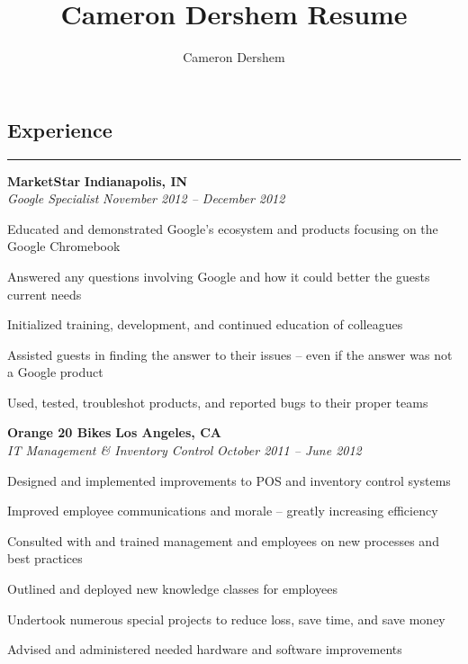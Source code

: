 \documentclass[10pt,letterpaper]{article}			%
\author{Cameron Dershem}							%
\title{Cameron Dershem Resume}						%
\newcommand{\JobHeader}[4]{							%
			\vspace{-.4em}
			\textbf{#1}
			\hfill
			\textbf{#2}
			\\
			\emph{#3}
			\hfill
			\emph{#4}\par
			\vspace{-1em}
			}
\begin{document}

%

\subsection*{Experience}
\vspace{-.68em}
\hrule
\vspace{0.8em}

	\JobHeader{MarketStar}{Indianapolis, IN}{Google Specialist}{November 2012 -- December 2012}
		\begin{itemize*}
		\item Educated and demonstrated Google's ecosystem and products focusing on the Google Chromebook
		\item Answered any questions involving Google and how it could better the guests current needs
		\item Initialized training, development, and continued education of colleagues
		\item Assisted guests in finding the answer to their issues -- even if the answer was not a Google product
		\item Used, tested, troubleshot products, and reported bugs to their proper teams
		\end{itemize*}

	\JobHeader{Orange 20 Bikes}{Los Angeles, CA}{IT Management \& Inventory Control}{October 2011 -- June 2012}
		\begin{itemize*}	
		\item Designed and implemented improvements to POS and inventory control systems
		\item Improved employee communications and morale -- greatly increasing efficiency
		\item Consulted with and trained management and employees on new processes and best practices
		\item Outlined and deployed new knowledge classes for employees 
		\item Undertook numerous special projects to reduce loss, save time, and save money
		\item Advised and administered needed hardware and software improvements
		\end{itemize*}
\end{document}
